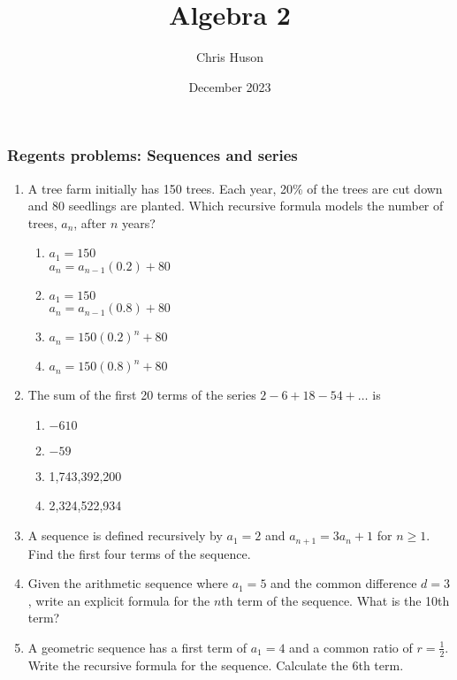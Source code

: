 \documentclass[12pt, twoside]{article}
\title{Algebra 2}
\author{Chris Huson}
\date{December 2023}
\begin{document}
\subsubsection*{Regents problems: Sequences and series}
\begin{enumerate}[itemsep=0.5cm]
\item A tree farm initially has 150 trees. Each year, 20\% of the trees are cut down and 80 seedlings are planted. Which recursive formula models the number of trees, $a_n$, after $n$ years? %
\begin{enumerate}
    \item $a_1 = 150$ \\ $a_n = a_{n-1}(0.2) + 80$
    \item $a_1 = 150$ \\ $a_n = a_{n-1}(0.8) + 80$
    \item $a_n = 150(0.2)^n + 80$
    \item $a_n = 150(0.8)^n + 80$
\end{enumerate}

\item The sum of the first 20 terms of the series \(2 - 6 + 18 - 54 + \ldots\) is %
\begin{enumerate}
    \item $-610$
    \item $-59$
    \item 1,743,392,200
    \item 2,324,522,934
\end{enumerate}

\item A sequence is defined recursively by \( a_1 = 2 \) and \( a_{n+1} = 3a_n + 1 \) for \( n \geq 1 \). Find the first four terms of the sequence.

\item Given the arithmetic sequence where \( a_1 = 5 \) and the common difference \( d = 3 \), write an explicit formula for the \( n \)th term of the sequence. What is the 10th term?

\item A geometric sequence has a first term of \( a_1 = 4 \) and a common ratio of \( r = \frac{1}{2} \). Write the recursive formula for the sequence. Calculate the 6th term.


\end{enumerate}
\end{document}
